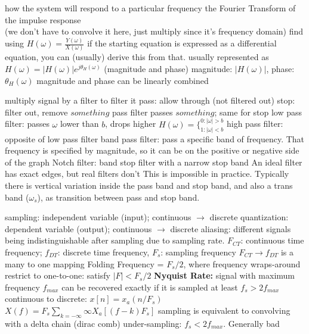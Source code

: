 \documentclass[12pt]{article}
\begin{document}
\begin{multicols*}{2}
\begin{flushleft}
\begin{outline}[longenum]
  \1 how the system will respond to a particular frequency
  \1 the Fourier Transform of the impulse response
    \\ (we don't have to convolve it here, just multiply since it's frequency domain)
  \1 find using $H(\omega)=\frac{Y(\omega)}{X(\omega)}$
    \2 if the starting equation is expressed as a differential equation, you can (usually) derive this from that.
  \1 usually represented as $H(\omega)=|H(\omega)|e^{j\theta_H(\omega)}$ (magnitude and phase)
    \2 magnitude: $|H(\omega)|$, phase: $\theta_H(\omega)$
  \1 magnitude and phase can be linearly combined

  \1 multiply signal by a filter to filter it
  \1 pass: allow through (not filtered out)
  \1 stop: filter out, remove
  \1 $something$ pass filter passes $something$; same for stop
  \1 low pass filter: passes $\omega$ lower than $b$, drops higher
    $H(\omega)=\{ _{1:|\omega|<b}^{0:|\omega|>b}$
  \1 high pass filter: opposite of low pass filter
  \1 band pass filter: pass a specific band of frequency.
    \2 That frequency is specified by magnitude, so it can be on the positive or negative side of the graph
  \1 Notch filter: band stop filter with a narrow stop band
  \1 An ideal filter has exact edges, but real filters don't
    \2 This is impossible in practice. 
      Typically there is vertical variation inside the pass band and stop band, and also a trans band ($\omega_s$), as transition between pass and stop band.

  \1 sampling: independent variable (input); continuous $\rightarrow$ discrete
  \1 quantization: dependent variable (output); continuous $\rightarrow$ discrete
  \1 aliasing: different signals being indistinguishable after sampling due to sampling rate.
  \1 $F_{CT}$: continuous time frequency; $f_{DT}$: discrete time frequency, $F_s$: sampling frequency
  \1 $F_{CT} \rightarrow f_{DT}$ is a many to one mapping
    \2 Folding Frequency = $F_s/2$, where frequency wraps-around
    \2 restrict to one-to-one: satisfy $|F| < F_s / 2$
  \1 \textbf{Nyquist Rate:} signal with maximum frequency $f_{max}$ can be recovered exactly if it is sampled at least $f_s > 2f_{max}$
  \1 continuous to discrete:
    \2 $x[n] = x_a(n/F_s)$
    \2 $X(f) = F_s \sum_{k=-\infty}{\infty} X_a[(f-k)F_s]$
  \1 sampling is equivalent to convolving with a delta chain (dirac comb) %
  \1 under-sampling: $f_s<2 f_{max}$. Generally bad


\end{outline}
\end{flushleft}
\end{multicols*}
\end{document}
